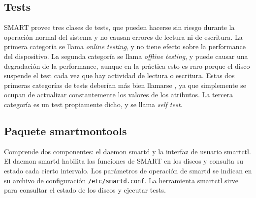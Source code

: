 

\subsection{Tests}

SMART provee tres clases de tests, que pueden hacerse sin riesgo durante la operación normal del sistema y no causan errores de lectura ni de escritura. La primera categoría se llama \emph{online testing}, y no tiene efecto sobre la performance del dispositivo. La segunda categoría se llama \emph{offline testing}, y puede causar una degradación de la performance, aunque en la práctica esto es raro porque el disco suspende el test cada vez que hay actividad de lectura o escritura. Estas dos primeras categorías de tests deberían más bien llamarse , ya que simplemente se ocupan de actualizar constantemente los valores de los atributos. 
La tercera categoría es un test propiamente dicho, y se llama \emph{self test}. 

\subsection{Paquete smartmontools}

Comprende dos componentes: el daemon smartd y la interfaz de usuario smartctl. El daemon smartd habilita las funciones de SMART en los discos y consulta su estado cada cierto intervalo. Los parámetros de operación de smartd se indican en su archivo de configuración \lstinline{/etc/smartd.conf}. La herramienta smartctl sirve para consultar el estado de los discos y ejecutar tests.

